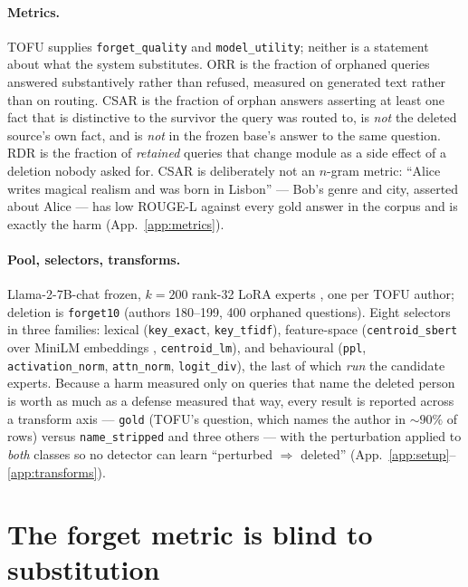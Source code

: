 \documentclass{article}
\newcommand{\csar}{CSAR}
\newcommand{\orr}{ORR}
\newcommand{\rdr}{RDR}
\newcommand{\fq}{\texttt{forget\_quality}}
\newcommand{\util}{\texttt{model\_utility}}
\begin{document}
\paragraph{Metrics.} TOFU supplies \fq{} and \util{}; neither is a statement about what the system
substitutes. \orr{} is the fraction of orphaned queries answered substantively rather than refused,
measured on generated text rather than on routing. \csar{} is the fraction of orphan answers
asserting at least one fact that is distinctive to the survivor the query was routed to, is
\emph{not} the deleted source's own fact, and is \emph{not} in the frozen base's answer to the same
question. \rdr{} is the fraction of \emph{retained} queries that change module as a side effect of
a deletion nobody asked for. \csar{} is deliberately not an $n$-gram metric: ``Alice writes magical
realism and was born in Lisbon'' --- Bob's genre and city, asserted about Alice --- has low ROUGE-L
against every gold answer in the corpus and is exactly the harm (App.~\ref{app:metrics}).

\paragraph{Pool, selectors, transforms.} Llama-2-7B-chat frozen, $k=200$ rank-32 LoRA experts
\citep{hu2022lora}, one per TOFU author; deletion is \texttt{forget10} (authors 180--199, 400
orphaned questions). Eight selectors in three families: lexical (\texttt{key\_exact},
\texttt{key\_tfidf}), feature-space (\texttt{centroid\_sbert} over MiniLM embeddings
\citep{reimers2019sbert}, \texttt{centroid\_lm}), and behavioural (\texttt{ppl},
\texttt{activation\_norm}, \texttt{attn\_norm}, \texttt{logit\_div}), the last of which \emph{run}
the candidate experts. Because a harm measured only on queries that name the deleted person is
worth as much as a defense measured that way, every result is reported across a transform axis --- \texttt{gold} (TOFU's question, which
names the author in ${\sim}90\%$ of rows) versus \texttt{name\_stripped} and three others --- with
the perturbation applied to \emph{both} classes so no detector can learn ``perturbed $\Rightarrow$
deleted'' (App.~\ref{app:setup}--\ref{app:transforms}).

\section{The forget metric is blind to substitution}
\label{sec:blind}
\end{document}
